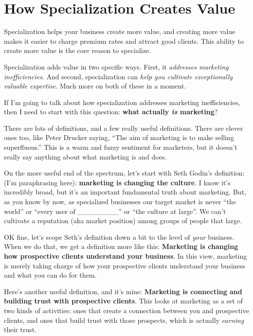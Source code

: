 \chapter{How Specialization Creates Value}

Specialization helps your business create more value, and creating more value makes it easier to charge premium rates and attract good clients. This ability to create more value is the core reason to specialize.

Specialization adds value in two specific ways. First, it \emph{addresses marketing inefficiencies}. And second, specialization can \emph{help you cultivate exceptionally valuable expertise}. Much more on both of these in a moment.

If I'm going to talk about how specialization addresses marketing inefficiencies, then I need to start with this question: \textbf{what actually \emph{is} marketing}?

There are lots of definitions, and a few really useful definitions. There are clever ones too, like Peter Drucker saying, ``The aim of marketing is to make selling superfluous.'' This is a warm and fuzzy sentiment for marketers, but it doesn't really say anything about what marketing is and does.

On the more useful end of the spectrum, let's start with Seth Godin’s definition: (I’m paraphrasing here): \textbf{marketing is changing the culture}. I know it's incredibly broad, but it's an important fundamental truth about marketing. But, as you know by now, as specialized businesses our target market is never ``the world'' or ``every user of \_\_\_\_\_\_\_\_'' or ``the culture at large''. We can't cultivate a reputation (aka market position) among groups of people that large.

OK fine, let’s scope Seth's definition down a bit to the level of \emph{your} business. When we do that, we get a definition more like this: \textbf{Marketing is changing how prospective clients understand your business}. In this view, marketing is merely taking charge of how your prospective clients understand your business and what you can do for them.

Here's another useful definition, and it's mine: \textbf{Marketing is connecting and building trust with prospective clients}. This looks at marketing as a set of two kinds of activities: ones that create a connection between you and prospective clients, and ones that build trust with those prospects, which is actually \emph{earning} their trust.

